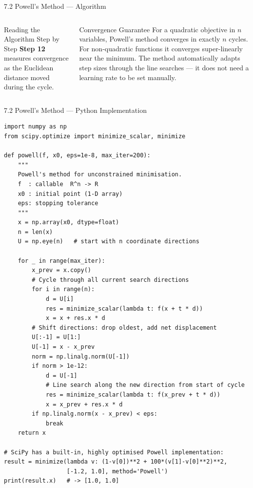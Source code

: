 \documentclass[aspectratio=169,10pt]{beamer}
\begin{document}
\begin{frame}[allowframebreaks]{7.2 Powell's Method --- Algorithm}
\begin{columns}[T]
\begin{block}{Reading the Algorithm Step by Step}
        \textbf{Step 12} measures convergence as the Euclidean distance
        moved during the cycle.
      \end{block}

      \begin{block}{Convergence Guarantee}
        For a quadratic objective in $n$ variables, Powell's method
        converges in exactly $n$ cycles.  For non-quadratic functions
        it converges super-linearly near the minimum.  The method
        automatically adapts step sizes through the line searches ---
        it does not need a learning rate to be set manually.
      \end{block}
  \end{columns}
\end{frame}

\begin{frame}[fragile]{7.2 Powell's Method --- Python Implementation}
\begin{lstlisting}[style=python, caption={Powell's method (Python/SciPy)}]
import numpy as np
from scipy.optimize import minimize_scalar, minimize

def powell(f, x0, eps=1e-8, max_iter=200):
    """
    Powell's method for unconstrained minimisation.
    f  : callable  R^n -> R
    x0 : initial point (1-D array)
    eps: stopping tolerance
    """
    x = np.array(x0, dtype=float)
    n = len(x)
    U = np.eye(n)   # start with n coordinate directions

    for _ in range(max_iter):
        x_prev = x.copy()
        # Cycle through all current search directions
        for i in range(n):
            d = U[i]
            res = minimize_scalar(lambda t: f(x + t * d))
            x = x + res.x * d
        # Shift directions: drop oldest, add net displacement
        U[:-1] = U[1:]
        U[-1] = x - x_prev
        norm = np.linalg.norm(U[-1])
        if norm > 1e-12:
            d = U[-1]
            # Line search along the new direction from start of cycle
            res = minimize_scalar(lambda t: f(x_prev + t * d))
            x = x_prev + res.x * d
        if np.linalg.norm(x - x_prev) < eps:
            break
    return x

# SciPy has a built-in, highly optimised Powell implementation:
result = minimize(lambda v: (1-v[0])**2 + 100*(v[1]-v[0]**2)**2,
                  [-1.2, 1.0], method='Powell')
print(result.x)   # -> [1.0, 1.0]
\end{lstlisting}
\end{frame}
\end{document}
